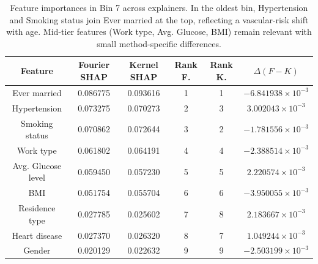 \documentclass[letterpaper,11pt]{article}
\numberwithin{equation}{section}
\numberwithin{equation}{section}
\begin{document}
\begin{table}[H]
    \centering
    \begin{tabular}{|c||c|c|c|c|c|} \hline 
         Feature & Fourier SHAP & Kernel SHAP & Rank F. & Rank K. & $\Delta (F-K) $ \\ \hline \hline 
        Ever married & 0.086775 & 0.093616 & 1 & 1 &	$-6.841938\times 10^{-3}$ \\ \hline 
        Hypertension &	0.073275 & 0.070273 & 2 & 3 & $	3.002043\times 10^{-3}$ \\ \hline 
        Smoking status & 0.070862 &	0.072644 & 3 & 2 &	$-1.781556 \times 10^{-3}$ \\ \hline 
        Work type &	0.061802 & 0.064191 & 4 & 4 &	$-2.388514\times 10^{-3}$ \\ \hline 
        Avg. Glucose level & 0.059450 &	0.057230 & 5 & 5 &	$2.220574\times 10^{-3}$\\ \hline 
        BMI & 0.051754 & 0.055704 &	6 &	6 & $-3.950055 \times 10^{-3}$\\ \hline 
        Residence type & 0.027785 &	0.025602 & 7 & 8 &	$2.183667\times 10^{-3}$ \\ \hline 
        Heart disease & 0.027370 & 0.026320 & 8 & 7 & $1.049244\times 10^{-3}$\\ \hline 
        Gender & 0.020129 &	0.022632 &	9 &	9 &	$-2.503199 \times 10^{-3}$\\ \hline 
    \end{tabular}
    \caption{Feature importances in Bin 7 across explainers. In the oldest bin, Hypertension and Smoking status join Ever married at the top, reflecting a vascular-risk shift with age. Mid-tier features (Work type, Avg. Glucose, BMI) remain relevant with small method-specific differences.}
\end{table}
\end{document}
